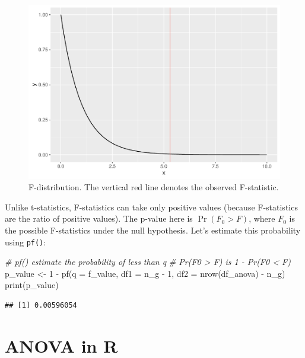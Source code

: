 \documentclass[
]{book}
\newenvironment{Shaded}{\begin{snugshade}}{\end{snugshade}}
\newcommand{\AttributeTok}[1]{\textcolor[rgb]{0.77,0.63,0.00}{#1}}
\newcommand{\CommentTok}[1]{\textcolor[rgb]{0.56,0.35,0.01}{\textit{#1}}}
\newcommand{\DecValTok}[1]{\textcolor[rgb]{0.00,0.00,0.81}{#1}}
\newcommand{\FunctionTok}[1]{\textcolor[rgb]{0.00,0.00,0.00}{#1}}
\newcommand{\NormalTok}[1]{#1}
\newcommand{\OtherTok}[1]{\textcolor[rgb]{0.56,0.35,0.01}{#1}}
\newcommand{\SpecialCharTok}[1]{\textcolor[rgb]{0.00,0.00,0.00}{#1}}
\begin{document}
\begin{figure}

{\centering \includegraphics{_main_files/figure-latex/f-dist-1} 

}

\caption{F-distribution. The vertical red line denotes the observed F-statistic.}\label{fig:f-dist}
\end{figure}

Unlike t-statistics, F-statistics can take only positive values (because F-statistics are the ratio of positive values). The p-value here is \(\Pr(F_0 > F)\), where \(F_0\) is the possible F-statistics under the null hypothesis. Let's estimate this probability using \texttt{pf()}:

\begin{Shaded}
\begin{Highlighting}[]
\CommentTok{\# pf() estimate the probability of less than q}
\CommentTok{\# Pr(F0 \textgreater{} F) is 1 {-} Pr(F0 \textless{} F)}
\NormalTok{p\_value }\OtherTok{\textless{}{-}} \DecValTok{1} \SpecialCharTok{{-}} \FunctionTok{pf}\NormalTok{(}\AttributeTok{q =}\NormalTok{ f\_value, }\AttributeTok{df1 =}\NormalTok{ n\_g }\SpecialCharTok{{-}} \DecValTok{1}\NormalTok{, }\AttributeTok{df2 =} \FunctionTok{nrow}\NormalTok{(df\_anova) }\SpecialCharTok{{-}}\NormalTok{ n\_g)}
\FunctionTok{print}\NormalTok{(p\_value)}
\end{Highlighting}
\end{Shaded}

\begin{verbatim}
## [1] 0.00596054
\end{verbatim}

\hypertarget{anova-in-r}{%
\section{ANOVA in R}\label{anova-in-r}}
\end{document}
